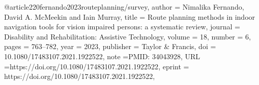 @article{220fernando2023routeplanning/survey,
author = {Nimalika Fernando, David A. McMeekin and Iain Murray},
title = {Route planning methods in indoor navigation tools for vision impaired persons: a systematic review},
journal = {Disability and Rehabilitation: Assistive Technology},
volume = {18},
number = {6},
pages = {763--782},
year = {2023},
publisher = {Taylor \& Francis},
doi = {10.1080/17483107.2021.1922522},
note ={PMID: 34043928},
URL ={https://doi.org/10.1080/17483107.2021.1922522},
eprint = {https://doi.org/10.1080/17483107.2021.1922522},
}